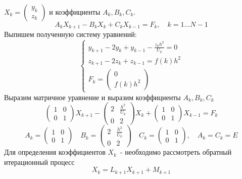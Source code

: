 	\(X_k= \left( \begin{matrix}
	y_k\\z_k
	\end{matrix} \right)\) 
	и коэффициенты \(A_k,B_k,C_k\).
	\begin{equation}
	A_kX_{k+1}-B_kX_k+C_kX_{k-1}=F_k, \quad k=1\ldots N-1
	\end{equation}
	Выпишем полученную систему уравнений:
	\begin{equation}
	\begin{cases}
	y_{k+1}-2y_k+y_{k-1} - \frac{z_kh^2}{U_k}=0 \\
	z_{k+1}-2z_k+z_{k-1}=f(k)h^2 \\
	F_k= \left( \begin{matrix}
	0\\f(k)h^2
	\end{matrix} \right)
	\end{cases}
	\end{equation}
	Выразим матричное уравнение и выразим коэффициенты \(A_k,B_k,C_k\)
	\begin{equation*}
	\left( \begin{matrix}
	1&0\\0&1
	\end{matrix} \right)X_{k+1}-\left( \begin{matrix}2&\frac{h^2}{U_k}\\0&2\end{matrix}\right)X_k+
	\left( \begin{matrix}1&0\\0&1\end{matrix}\right)X_{k-1}=F_k
	\end{equation*}
	\begin{equation}\label{eq4}
	A_k=\left( \begin{matrix}1&0\\0&1\end{matrix} \right) \quad 
	B_k=\left( \begin{matrix}2&\frac{h^2}{U_k}\\0&2\end{matrix} \right) \quad 
	C_k=\left( \begin{matrix}1&0\\0&1\end{matrix} \right), \quad  A_k=C_k=E
	\end{equation}
	Для определения коэффициентов \(X_k\)~- необходимо рассмотреть обратный итерационный процесс
	\begin{equation}\label{eq5}
	X_k=L_{k+1}X_{k+1}+M_{k+1}
	\end{equation}
